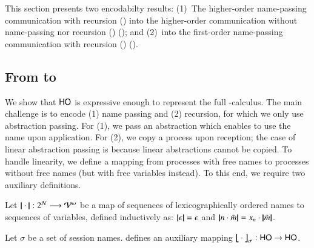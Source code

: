 \noi This section presents two encodabilty results:
(1)~The higher-order name-passing communication with recursion (\HOp) into 
the higher-order communication without name-passing nor 
recursion (\HO) (); and 
(2)~\HOp into the first-order name-passing communication
with recursion (\sessp) (). 

 


\subsection{From \HOp to \HO}
\label{subsec:HOpi_to_HO}
\noi We show that $\mathsf{HO}$ is expressive enough to
represent the full
 \HOp-calculus.
The main challenge is to encode (1) name passing 
and (2) recursion, 
for which 
we only use  abstraction passing. For (1), we pass  
an %
abstraction which enables to use the name upon application. 
For (2), we 
copy a process upon reception; the case of linear abstraction passing
is  
because 
linear abstractions cannot be copied.
To handle linearity, we define 
a mapping from processes with free names to processes without free
names (but with free variables instead).
To this end, we require two auxiliary definitions.

\smallskip 

\begin{definition}\rm 
\label{def:hop_to_ho}
	Let $|\!|\cdot|\!|: 2^{\mathcal{N}} \longrightarrow \mathcal{V}^\omega$
	be a map of sequences of 
lexicographically ordered names to sequences of variables, defined
	inductively as: 
	$|\!|\epsilon|\!| = \epsilon$ and $|\!|n \cdot \tilde{m}|\!| = x_n \cdot |\!|\tilde{m}|\!|$. 
\end{definition}

\smallskip 

%

\begin{definition} \label{d:trabs}\label{d:auxmap}
	Let $\sigma$ be a set of session names.
	 defines an auxiliary mapping
	$\big\lfloor\!\!\big\lfloor\cdot\big\rfloor\!\!\big\rfloor^{}_\sigma: \mathsf{HO} \to \mathsf{HO}$.
\end{definition}

